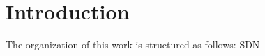 \chapter{Introduction}\label{ch:introduction}

\bigskip
\bigskip
\bigskip
The organization of this work is structured as follows:
 \ac{SDN}






